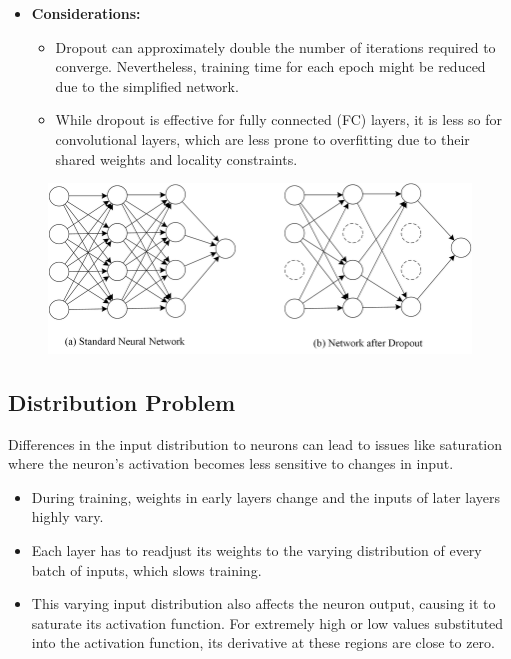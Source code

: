 \begin{itemize}
    \item \textbf{Considerations:}
    \begin{itemize}
        \item Dropout can approximately double the number of iterations required to converge. Nevertheless, training time for each epoch might be reduced due to the simplified network.
        \item While dropout is effective for fully connected (FC) layers, it is less so for convolutional layers, which are less prone to overfitting due to their shared weights and locality constraints.
    \end{itemize}
\end{itemize}

\begin{figure}[H]
    \centering
    \includegraphics[width=0.75\linewidth]{img/dropout.png}
    
    \label{fig:dropout}
\end{figure}
\subsection{Distribution Problem}
Differences in the input distribution to neurons can lead to issues like saturation where the neuron's activation becomes less sensitive to changes in input.
\begin{itemize}
    \item During training, weights in early layers change and the inputs of later layers highly vary.
    \item Each layer has to readjust its weights to the varying distribution of every batch of inputs, which slows training.
    \item This varying input distribution also affects the neuron output, causing it to saturate its activation function. For extremely high or low values substituted into the activation function, its derivative at these regions are close to zero.
\end{itemize}

